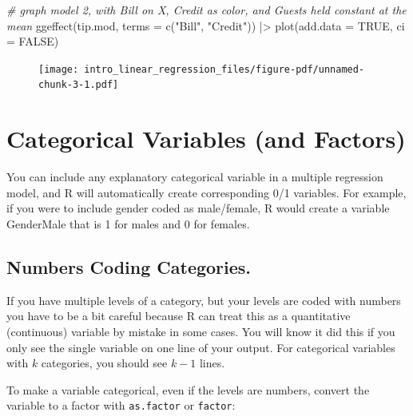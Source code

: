 \documentclass[
  letterpaper,
  DIV=11,
  numbers=noendperiod]{scrreprt}
\newenvironment{Shaded}{\begin{snugshade}}{\end{snugshade}}
\newcommand{\AttributeTok}[1]{\textcolor[rgb]{0.49,0.56,0.16}{#1}}
\newcommand{\CommentTok}[1]{\textcolor[rgb]{0.38,0.63,0.69}{\textit{#1}}}
\newcommand{\ConstantTok}[1]{\textcolor[rgb]{0.53,0.00,0.00}{#1}}
\newcommand{\FunctionTok}[1]{\textcolor[rgb]{0.02,0.16,0.49}{#1}}
\newcommand{\NormalTok}[1]{\textcolor[rgb]{0.00,0.44,0.13}{#1}}
\newcommand{\SpecialCharTok}[1]{\textcolor[rgb]{0.25,0.44,0.63}{#1}}
\newcommand{\StringTok}[1]{\textcolor[rgb]{0.25,0.44,0.63}{#1}}
\begin{document}
\begin{Shaded}
\begin{Highlighting}[]
\CommentTok{\# graph model 2, with Bill on X, Credit as color, and Guests held constant at the mean}
\FunctionTok{ggeffect}\NormalTok{(tip.mod, }\AttributeTok{terms =} \FunctionTok{c}\NormalTok{(}\StringTok{"Bill"}\NormalTok{, }\StringTok{"Credit"}\NormalTok{)) }\SpecialCharTok{|\textgreater{}} 
  \FunctionTok{plot}\NormalTok{(}\AttributeTok{add.data =} \ConstantTok{TRUE}\NormalTok{, }\AttributeTok{ci =} \ConstantTok{FALSE}\NormalTok{)}
\end{Highlighting}
\end{Shaded}

\begin{figure}[H]

{\centering \texttt{[image: intro\_linear\_regression\_files/figure-pdf/unnamed-chunk-3-1.pdf]}

}

\end{figure}

\hypertarget{categorical-variables-and-factors}{%
\section{Categorical Variables (and
Factors)}\label{categorical-variables-and-factors}}

You can include any explanatory categorical variable in a multiple
regression model, and R will automatically create corresponding 0/1
variables. For example, if you were to include gender coded as
male/female, R would create a variable GenderMale that is 1 for males
and 0 for females.

\hypertarget{numbers-coding-categories.}{%
\subsection{Numbers Coding
Categories.}\label{numbers-coding-categories.}}

If you have multiple levels of a category, but your levels are coded
with numbers you have to be a bit careful because R can treat this as a
quantitative (continuous) variable by mistake in some cases. You will
know it did this if you only see the single variable on one line of your
output. For categorical variables with \(k\) categories, you should see
\(k-1\) lines.

To make a variable categorical, even if the levels are numbers, convert
the variable to a factor with \texttt{as.factor} or \texttt{factor}:
\end{document}
